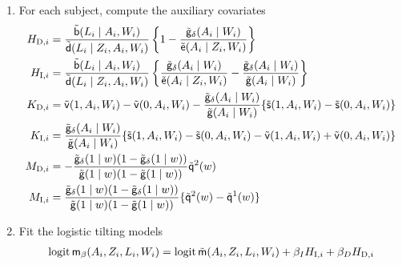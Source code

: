 \begin{enumerate}[label=Step \arabic*., align=left, leftmargin=*]
\item \label{step:computeH} For each subject, compute the auxiliary covariates
  \begin{align*}
    H_{\mbox{\scriptsize D}, i} &= \frac{{\tilde{\mathsf{b}}}(L_i\mid A_i,
                                  W_i)}{{\tilde{\mathsf{d}}}(L_i \mid Z_i, A_i,
                                  W_i)}\left\{1-\frac{{\tilde{\mathsf{g}}}_\delta(A_i\mid
                                  W_i)}{{\tilde{\mathsf{e}}}(A_i\mid Z_i,W_i)}\right\}\\
    H_{\mbox{\scriptsize I}, i} &= \frac{{\tilde{\mathsf{b}}}(L_i\mid A_i,
                                  W_i)}{{\tilde{\mathsf{d}}}(L_i \mid Z_i, A_i,
                                  W_i)}\left\{\frac{{\tilde{\mathsf{g}}}_\delta(A_i\mid
                                  W_i)}{{\tilde{\mathsf{e}}}(A_i\mid
                                  Z_i,W_i)}-\frac{\tilde{\mathsf{g}}_\delta(A_i
                                  \mid W_i)}{{\tilde{\mathsf{g}}}(A_i\mid
                                  W_i)}\right\}\\
    K_{\mbox{\scriptsize D}, i} & = {\tilde{\mathsf{v}}}(1,A_i,W_i)
                                  - {\tilde{\mathsf{v}}}(0,A_i,W_i) - \frac{{\tilde{\mathsf{g}}}_\delta(A_i
                                  \mid W_i)}{{\tilde{\mathsf{g}}}(A_i\mid W_i)} \{{\tilde{\mathsf{s}}}(1,A_i,W_i) -
                                  {\tilde{\mathsf{s}}}(0,A_i,W_i)\}\\
    K_{\mbox{\scriptsize I}, i} & = \frac{{\tilde{\mathsf{g}}}_\delta(A_i
                                  \mid W_i)}{{\tilde{\mathsf{g}}}(A_i\mid W_i)}
                                  \{{\tilde{\mathsf{s}}}(1,A_i,W_i) -
                                  {\tilde{\mathsf{s}}}(0,A_i,W_i) - {\tilde{\mathsf{v}}}(1,A_i,W_i)
                                  + {\tilde{\mathsf{v}}}(0,A_i,W_i)\}\\
    M_{\mbox{\scriptsize D}, i} & = -\frac{\tilde{\mathsf{g}}_\delta(1\mid w)(1 -
                                  \tilde{\mathsf{g}}_\delta(1\mid w))}{\tilde{\mathsf{g}}(1\mid w)(1 -
                                  \tilde{\mathsf{g}}(1\mid w))}{\tilde{\mathsf{q}}}^2(w)\\
    M_{\mbox{\scriptsize I}, i} & = \frac{\tilde{\mathsf{g}}_\delta(1\mid w)(1 -
                                  \tilde{\mathsf{g}}_\delta(1\mid w))}{\tilde{\mathsf{g}}(1\mid w)(1 -
                                  \tilde{\mathsf{g}}(1\mid w))}\{{\tilde{\mathsf{q}}}^2(w)-{\tilde{\mathsf{q}}}^1(w)\}
  \end{align*}
\item \label{step:fit} Fit the logistic tilting models
  \begin{align*}
    \logit \m_\beta(A_i,Z_i,L_i,W_i) &= \logit \tilde
                                       \m(A_i,Z_i,L_i,W_i) + \beta_I H_{\mbox{\scriptsize I}, i} +
                                       \beta_D H_{\mbox{\scriptsize D}, i}\\

\end{align*}
\end{enumerate}
